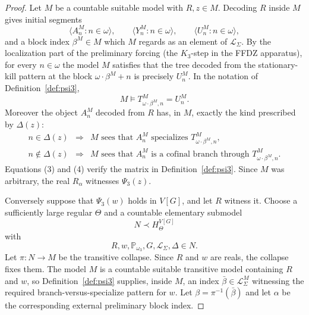 \documentclass[10pt,a4paper]{amsart}
\newcommand{\Pp}{\mathbb P}
\newcommand{\PsiThree}{\Psi_{3}}
\begin{document}
\begin{proof}
Let $M$ be a countable suitable model with $R,z\in M$.  Decoding $R$ inside $M$ gives
initial segments
\[
\langle A^M_n:n\in\omega\rangle,
\qquad
\langle Y^M_n:n\in\omega\rangle,
\qquad
\langle U^M_n:n\in\omega\rangle,
\]
and a block index $\beta^M\in M$ which $M$ regards as an element of
$\mathcal L_{\Sigma}$.  By the localization part of the preliminary forcing
(the $K_3$-step in the FFDZ apparatus), for every $n\in\omega$ the model $M$ satisfies
that the tree decoded from the stationary-kill pattern at the block
$\omega\cdot\beta^M+n$ is precisely $U^M_n$.  In the notation of Definition~\ref{def:psi3},
\[
M\models
T^M_{\omega\cdot\beta^M,n}=U^M_n.              \tag{3}
\]
Moreover the object $A^M_n$ decoded from $R$ has, in $M$, exactly the kind prescribed by
$\Delta(z)$:
\[
\begin{array}{rcl}
n\in\Delta(z)     &\Longrightarrow& M\text{ sees that }A^M_n\text{ specializes }T^M_{\omega\cdot\beta^M,n},\\[2mm]
n\notin\Delta(z) &\Longrightarrow& M\text{ sees that }A^M_n\text{ is a cofinal branch through }T^M_{\omega\cdot\beta^M,n}.
\end{array}                                      \tag{4}
\]
Equations (3) and (4) verify the matrix in Definition~\ref{def:psi3}.  Since $M$ was
arbitrary, the real $R_\alpha$ witnesses $\PsiThree(z)$.

Conversely suppose that $\PsiThree(w)$ holds in $V[G]$, and let $R$ witness it.
Choose a sufficiently large regular $\Theta$ and a countable elementary submodel
\[
N\prec H_\Theta^{V[G]}
\]
with
\[
R,w,\Pp_{\omega_3},G,\mathcal L_{\Sigma},\Delta\in N.
\]
Let $\pi:N\to M$ be the transitive collapse.  Since $R$ and $w$ are reals, the
collapse fixes them.  The model $M$ is a countable suitable transitive model
containing $R$ and $w$, so Definition~\ref{def:psi3} supplies, inside $M$, an
index $\bar\beta\in\mathcal L_{\Sigma}^M$ witnessing the required
branch-versus-specialize pattern for $w$.  Let $\beta=\pi^{-1}(\bar\beta)$ and
let $\alpha$ be the corresponding external preliminary block index.


\end{proof}
\end{document}
